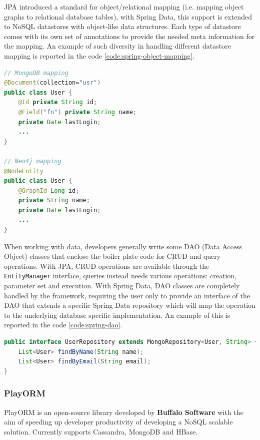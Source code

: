 \noindent JPA introduced a standard for object/relational mapping (i.e. mapping object graphs to relational database tables), with Spring Data, this support is extended to NoSQL datastores with object-like data structures.
Each type of datastore comes with its own set of annotations to provide the needed meta information for the mapping. An example of such diversity in handling different datastore mapping is reported in the code \ref{code:spring-object-mapping}.

\begin{lstlisting}[language=Java, caption=Spring Data object mapping, label=code:spring-object-mapping]
// MongoDB mapping
@Document(collection="usr")
public class User {
    @Id private String id;
    @Field("fn") private String name;
    private Date lastLogin;
    ...
}

// Neo4j mapping
@NodeEntity
public class User {
    @GraphId Long id;
    private String name;
    private Date lastLogin;
    ...
}
\end{lstlisting}

\noindent When working with data, developers generally write some DAO (Data Access Object) classes that enclose the boiler plate code for CRUD and query operations.
With JPA, CRUD operations are available through the \texttt{EntityManager} interface, queries instead needs various operations: creation, parameter set and execution.
With Spring Data, DAO classes are completely handled by the framework, requiring the user only to provide an interface of the DAO that extends a specific Spring Data repository which will map the operation to the underlying database specific implementation.
An example of this is reported in the code \ref{code:spring-dao}.

\begin{lstlisting}[language=Java, caption=Spring Data repositories, label=code:spring-dao]
public interface UserRepository extends MongoRepository<User, String> {
    List<User> findByName(String name);
    List<User> findByEmail(String email);
}
\end{lstlisting}

\subsubsection{PlayORM}
PlayORM \cite{online:playorm} is an open-source library developed by \textbf{Buffalo Software} with the aim of speeding up developer productivity of developing a NoSQL scalable solution. Currently supports Cassandra, MongoDB and HBase. 

